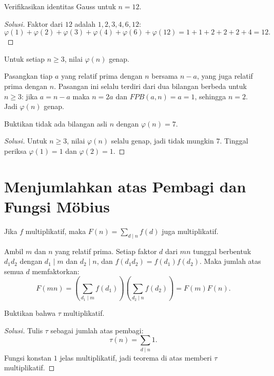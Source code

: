 \documentclass[12pt]{scrartcl}
\begin{document}
\begin{example}
Verifikasikan identitas Gauss untuk $n = 12$.
\end{example}
\begin{proof}[Solusi]
Faktor dari $12$ adalah $1, 2, 3, 4, 6, 12$:
\[ \varphi(1) + \varphi(2) + \varphi(3) + \varphi(4) + \varphi(6) + \varphi(12)
= 1 + 1 + 2 + 2 + 2 + 4 = 12. \]
\end{proof}

\begin{fact}
Untuk setiap $n \ge 3$, nilai $\varphi(n)$ genap.
\end{fact}

Pasangkan tiap $a$ yang relatif prima dengan $n$ bersama $n - a$,
yang juga relatif prima dengan $n$.
Pasangan ini selalu terdiri dari dua bilangan berbeda untuk $n \ge 3$:
jika $a = n - a$ maka $n = 2a$ dan $FPB(a, n) = a = 1$,
sehingga $n = 2$. Jadi $\varphi(n)$ genap.

\begin{example}
Buktikan tidak ada bilangan asli $n$ dengan $\varphi(n) = 7$.
\end{example}
\begin{proof}[Solusi]
Untuk $n \ge 3$, nilai $\varphi(n)$ selalu genap, jadi tidak mungkin $7$.
Tinggal periksa $\varphi(1) = 1$ dan $\varphi(2) = 1$.
\end{proof}

\section{Menjumlahkan atas Pembagi dan Fungsi M\"obius}

\begin{theorem}
Jika $f$ multiplikatif, maka $F(n) = \sum_{d \mid n} f(d)$ juga multiplikatif.
\end{theorem}

Ambil $m$ dan $n$ yang relatif prima.
Setiap faktor $d$ dari $mn$ tunggal berbentuk $d_1 d_2$ dengan $d_1 \mid m$
dan $d_2 \mid n$, dan $f(d_1 d_2) = f(d_1)f(d_2)$.
Maka jumlah atas semua $d$ memfaktorkan:
\[ F(mn) = \left(\sum_{d_1 \mid m} f(d_1)\right)\left(\sum_{d_2 \mid n} f(d_2)\right)
= F(m)F(n). \]

\begin{example}
Buktikan bahwa $\tau$ multiplikatif.
\end{example}
\begin{proof}[Solusi]
Tulis $\tau$ sebagai jumlah atas pembagi:
\[ \tau(n) = \sum_{d \mid n} 1. \]
Fungsi konstan $1$ jelas multiplikatif, jadi teorema di atas memberi
$\tau$ multiplikatif.
\end{proof}
\end{document}
